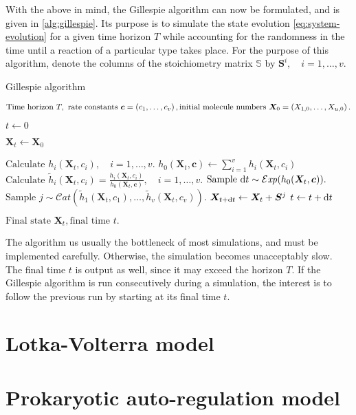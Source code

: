 With the above in mind, the Gillespie algorithm can now be formulated, and is given in \autoref{alg:gillespie}. Its purpose is to simulate the state evolution \eqref{eq:system-evolution} for a given time horizon $T$ while accounting for the randomness in the time until a reaction of a particular type takes place. For the purpose of this algorithm, denote the columns of the stoichiometry matrix $\mathbb{S}$ by $\bm{S}^i, \quad i = 1, \ldots, v$.
\begin{algorithm}[ht]
    \caption{Gillespie algorithm}
    \label{alg:gillespie}
    \begin{algorithmic}[1]
        \Input $\text{Time horizon } T, \text{ rate constants } \bm{c} = \left(c_1, \ldots, c_v\right),\ \newline \text{initial molecule numbers } \bm{X}_0 = \left(X_{1,0}, \ldots, X_{u,0} \right).$
        
        \State $t \gets 0$
        
        \State $\bm{X}_t \gets \bm{X}_0$
        
            \State $\text{Calculate } h_i(\bm{X}_t, c_i), \quad i = 1, \ldots, v.$
            \State $h_0(\bm{X}_t, \bm{c}) \gets \sum_{i=1}^v h_i(\bm{X}_t, c_i)$
            \State $\text{Calculate } \displaystyle \widetilde{h}_i(\bm{X}_t,c_i) = \frac{h_i(\bm{X}_t,c_i)}{h_0(\bm{X}_t, \bm{c})}, \quad i = 1, \ldots, v.$
            \State $\text{Sample } \mathrm{d}{t} \sim \mathcal{E}\mathit{xp}(h_0(\bm{X}_t, \bm{c})).$ 
            \State $\text{Sample } j \sim \mathcal{C}\mathit{at}(\widetilde{h}_1(\bm{X}_t,c_1), \ldots, \widetilde{h}_v(\bm{X}_t,c_v)).$ 
            \State $\bm{X}_{t + \mathrm{d}{t}} \gets \bm{X}_t + \bm{S}^j$ 
            \State $t \gets t + \mathrm{d}{t}$
        \EndWhile
        
        \Output $\text{Final state } \bm{X}_t, \text {final time } t.$
    \end{algorithmic}
\end{algorithm}
The algorithm us usually the bottleneck of most simulations, and must be implemented carefully. Otherwise, the simulation becomes unacceptably slow. The final time $t$ is output as well, since it may exceed the horizon $T$. If the Gillespie algorithm is run consecutively during a simulation, the interest is to follow the previous run by starting at its final time $t$.

\section{Lotka-Volterra model} \label{sec:lotka-volterra}

\section{Prokaryotic auto-regulation model} \label{sec:autoregulation}